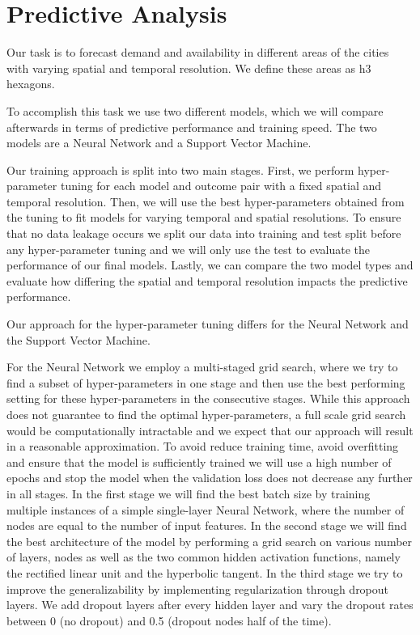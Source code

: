 \section{Predictive Analysis}
\label{sec:predictive_analysis}

Our task is to forecast demand and availability in different areas of the cities with varying spatial and temporal resolution. 
We define these areas as h3 hexagons.  


To accomplish this task we use two different models, which we will compare afterwards in terms of predictive performance and training speed. 
The two models are a Neural Network and a Support Vector Machine.  

Our training approach is split into two main stages.
First, we perform hyper-parameter tuning for each model and outcome pair with a fixed spatial and temporal resolution. Then, we will use the best hyper-parameters obtained from the tuning to fit models for varying temporal and spatial resolutions.
To ensure that no data leakage occurs we split our data into training and test split before any hyper-parameter tuning and we will only use the test to evaluate the performance of our final models.
Lastly, we can compare the two model types and evaluate how differing the spatial and temporal resolution impacts the predictive performance.  


Our approach for the hyper-parameter tuning differs for the Neural Network and the Support Vector Machine. 

For the Neural Network we employ a multi-staged grid search, where we try to find a subset of hyper-parameters in one stage and then use the best performing setting for these hyper-parameters in the consecutive stages.
While this approach does not guarantee to find the optimal hyper-parameters, a full scale grid search would be computationally intractable and we expect that our approach will result in a reasonable approximation.
To avoid reduce training time, avoid overfitting and ensure that the model is sufficiently trained we will use a high number of epochs and stop the model when the validation loss does not decrease any further in all stages.
In the first stage we will find the best batch size by training multiple instances of a simple single-layer Neural Network, where the number of nodes are equal to the number of input features.
In the second stage we will find the best architecture of the model by performing a grid search on various number of layers, nodes as well as the two common hidden activation functions, namely the rectified linear unit and the hyperbolic tangent.
In the third stage we try to improve the generalizability by implementing regularization through dropout layers.
We add dropout layers after every hidden layer and vary the dropout rates between 0 (no dropout) and 0.5 (dropout nodes half of the time).

